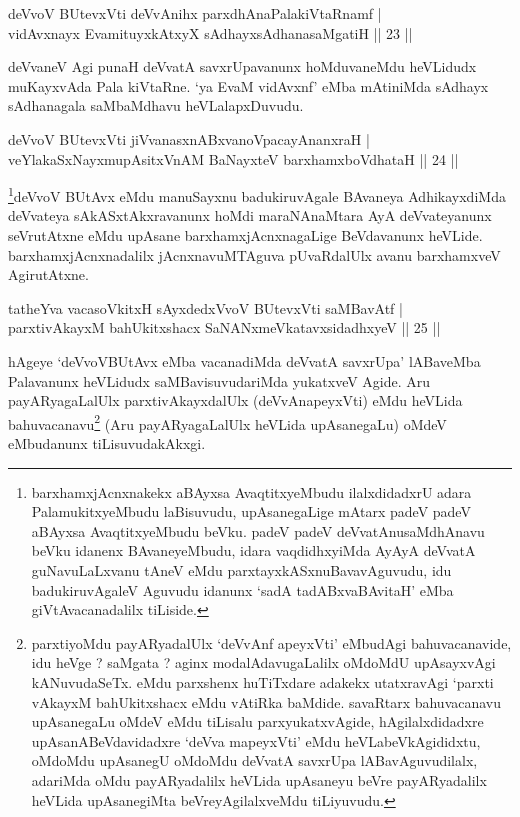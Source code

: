 \begin{shl}
deVvoV BUtevxVti deVvAnihx parxdhAnaPalakiVtaRnamf |\\
vidAvxnayx EvamituyxkAtxyX sAdhayxsAdhanasaMgatiH \hfill || 23 || 
\end{shl}

\begin{artha}
deVvaneV Agi punaH deVvatA savxrUpavanunx hoMduvaneMdu heVLidudx muKayxvAda Pala kiVtaRne. `ya EvaM vidAvxnf' eMba mAtiniMda sAdhayx sAdhanagala saMbaMdhavu heVLalapxDuvudu.
\end{artha}

\begin{shl}
deVvoV BUtevxVti jiVvanasxnABxvanoVpacayAnanxraH |\\
veYlakaSxNayxmupAsitxVnAM BaNayxteV barxhamxboVdhataH \hfill || 24 || 
\end{shl}

\begin{artha}
\footnote{barxhamxjAcnxnakekx aBAyxsa AvaqtitxyeMbudu ilalxdidadxrU adara PalamukitxyeMbudu laBisuvudu, upAsanegaLige mAtarx padeV padeV aBAyxsa AvaqtitxyeMbudu beVku. padeV padeV deVvatAnusaMdhAnavu beVku idanenx BAvaneyeMbudu, idara vaqdidhxyiMda AyAyA deVvatA guNavuLaLxvanu tAneV eMdu parxtayxkASxnuBavavAguvudu, idu badukiruvAgaleV Aguvudu idanunx `sadA tadABxvaBAvitaH' eMba giVtAvacanadalilx tiLiside.}deVvoV BUtAvx eMdu manuSayxnu badukiruvAgale BAvaneya AdhikayxdiMda deVvateya sAkASxtAkxravanunx hoMdi maraNAnaMtara AyA deVvateyanunx seVrutAtxne eMdu upAsane barxhamxjAcnxnagaLige BeVdavanunx heVLide. barxhamxjAcnxnadalilx jAcnxnavuMTAguva pUvaRdalUlx avanu barxhamxveV AgirutAtxne.
\end{artha}

\begin{shl}
tatheYva vacasoVkitxH sAyxdedxVvoV BUtevxVti saMBavAtf |\\
parxtivAkayxM bahUkitxshacx SaNANxmeVkatavxsidadhxyeV \hfill || 25 || 
\end{shl}

\begin{artha}
hAgeye  `deVvoVBUtAvx eMba vacanadiMda deVvatA savxrUpa' lABaveMba Palavanunx heVLidudx saMBavisuvudariMda yukatxveV Agide. Aru payARyagaLalUlx parxtivAkayxdalUlx (deVvAnapeyxVti) eMdu heVLida bahuvacanavu\footnote{parxtiyoMdu payARyadalUlx `deVvAnf apeyxVti' eMbudAgi bahuvacanavide, idu heVge ? saMgata ? aginx modalAdavugaLalilx oMdoMdU upAsayxvAgi kANuvudaSeTx. eMdu parxshenx huTiTxdare adakekx utatxravAgi `parxti vAkayxM bahUkitxshacx eMdu vAtiRka baMdide. savaRtarx bahuvacanavu upAsanegaLu oMdeV eMdu tiLisalu parxyukatxvAgide, hAgilalxdidadxre upAsanABeVdavidadxre `deVva mapeyxVti' eMdu heVLabeVkAgididxtu, oMdoMdu upAsanegU oMdoMdu deVvatA savxrUpa lABavAguvudilalx, adariMda oMdu payARyadalilx heVLida upAsaneyu beVre payARyadalilx heVLida upAsanegiMta beVreyAgilalxveMdu tiLiyuvudu.} (Aru payARyagaLalUlx heVLida upAsanegaLu) oMdeV eMbudanunx tiLisuvudakAkxgi.
\end{artha}

